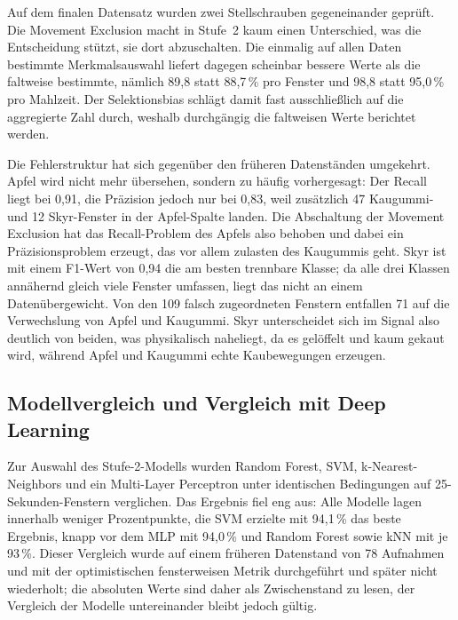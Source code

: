 \documentclass[11pt]{article}
\begin{document}
Auf dem finalen Datensatz wurden zwei Stellschrauben gegeneinander geprüft. Die Movement
Exclusion macht in Stufe~2 kaum einen Unterschied, was die Entscheidung stützt, sie dort
abzuschalten. Die einmalig auf allen Daten bestimmte Merkmalsauswahl liefert dagegen
scheinbar bessere Werte als die faltweise bestimmte, nämlich 89,8 statt 88,7\,\% pro
Fenster und 98,8 statt 95,0\,\% pro Mahlzeit. Der Selektionsbias schlägt damit fast
ausschließlich auf die aggregierte Zahl durch, weshalb durchgängig die faltweisen Werte
berichtet werden.

Die Fehlerstruktur hat sich gegenüber den früheren Datenständen umgekehrt. Apfel wird nicht
mehr übersehen, sondern zu häufig vorhergesagt: Der Recall liegt bei 0,91, die Präzision
jedoch nur bei 0,83, weil zusätzlich 47 Kaugummi- und 12 Skyr-Fenster in der Apfel-Spalte
landen. Die Abschaltung der Movement Exclusion hat das Recall-Problem des Apfels also
behoben und dabei ein Präzisionsproblem erzeugt, das vor allem zulasten des Kaugummis geht.
Skyr ist mit einem F1-Wert von 0,94 die am besten trennbare Klasse; da alle drei Klassen
annähernd gleich viele Fenster umfassen, liegt das nicht an einem Datenübergewicht. Von den
109 falsch zugeordneten Fenstern entfallen 71 auf die Verwechslung von Apfel und Kaugummi.
Skyr unterscheidet sich im Signal also deutlich von beiden, was physikalisch naheliegt, da
es gelöffelt und kaum gekaut wird, während Apfel und Kaugummi echte Kaubewegungen erzeugen.

\subsection{Modellvergleich und Vergleich mit Deep Learning}

Zur Auswahl des Stufe-2-Modells wurden Random Forest, SVM, k-Nearest-Neighbors und ein
Multi-Layer Perceptron unter identischen Bedingungen auf 25-Sekunden-Fenstern verglichen. Das Ergebnis fiel eng aus:
Alle Modelle lagen innerhalb weniger Prozentpunkte, die SVM erzielte mit 94,1\,\% das beste
Ergebnis, knapp vor dem MLP mit 94,0\,\% und Random Forest sowie kNN mit je 93\,\%. Dieser
Vergleich wurde auf einem früheren Datenstand von 78 Aufnahmen und mit der optimistischen
fensterweisen Metrik durchgeführt und später nicht wiederholt; die absoluten Werte sind
daher als Zwischenstand zu lesen, der Vergleich der Modelle untereinander bleibt jedoch
gültig.
\end{document}
